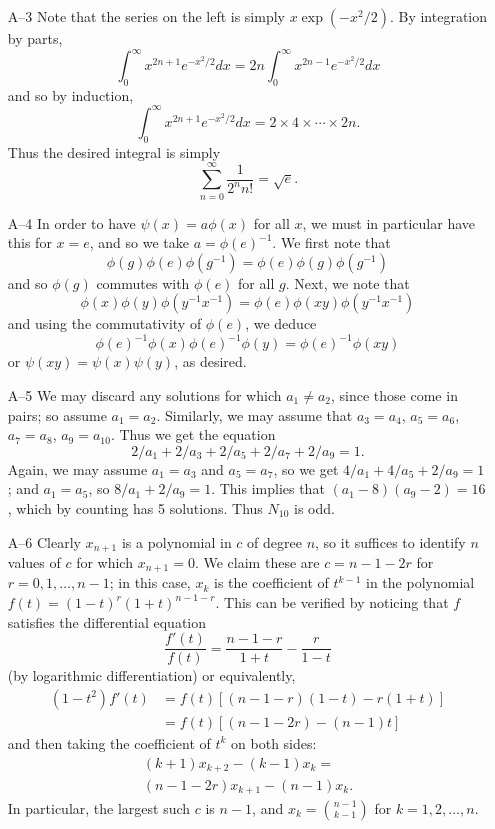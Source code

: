 \documentclass[amssymb,twocolumn,pra,10pt,aps]{revtex4-1}
\begin{document}
\begin{itemize}
\item[A--3]
Note that the series on the left is simply $x \exp (-x^2/2)$.  By
integration by parts,
\[
\int_0^\infty x^{2n+1} e^{-x^2/2} dx =
2n \int_0^\infty x^{2n-1} e^{-x^2/2} dx
\]
and so by induction,
\[
\int_0^\infty x^{2n+1} e^{-x^2/2} dx =
2 \times 4 \times \cdots \times 2n.
\]
Thus the desired
integral is simply
\[
\sum_{n=0}^\infty \frac{1}{2^n n!} = \sqrt{e}.
\]

\item[A--4]
In order to have $\psi(x) = a \phi(x)$ for all $x$, we must in
particular have this for $x = e$, and so we take $a = \phi(e)^{-1}$.
We first note that
\[
\phi(g) \phi(e) \phi(g^{-1}) = \phi(e) \phi(g) \phi(g^{-1})
\]
and so $\phi(g)$ commutes with $\phi(e)$ for all $g$. Next, we note that
\[
\phi(x) \phi(y) \phi(y^{-1}x^{-1}) = \phi(e) \phi(xy) \phi(y^{-1}x^{-1})
\]
and using the commutativity of $\phi(e)$, we deduce
\[
\phi(e)^{-1} \phi(x) \phi(e)^{-1} \phi(y) = \phi(e)^{-1} \phi(xy)
\]
or $\psi(xy) = \psi(x) \psi(y)$, as desired.

\item[A--5]
We may discard any solutions for which $a_1 \neq a_2$, since those come in
pairs; so assume $a_1 = a_2$.  Similarly, we may assume that $a_3 = a_4$,
$a_5 = a_6$, $a_7 = a_8$, $a_9=a_{10}$.  Thus we get the equation
\[
2/a_1 + 2/a_3 + 2/a_5 + 2/a_7 + 2/a_9 = 1.
\]
Again, we may assume $a_1 = a_3$ and $a_5 = a_7$, so we get $4/a_1 + 4/a_5
+ 2/a_9 = 1$; and $a_1 = a_5$, so $8/a_1 + 2/a_9 = 1$.  This implies that
$(a_1-8)(a_9-2) = 16$, which by counting has 5 solutions.  Thus $N_{10}$
is odd.

\item[A--6]
Clearly $x_{n+1}$ is a polynomial in $c$ of degree $n$,
so it suffices to identify $n$ values of $c$ for which $x_{n+1} =
0$. We claim these are $c = n-1-2r$ for $r=0,1,\dots, n-1$; in this
case, $x_k$ is the coefficient of $t^{k-1}$ in the polynomial
$f(t) = (1-t)^r (1+t)^{n-1-r}$. This can be verified by noticing that
$f$ satisfies the differential equation
\[
\frac{f'(t)}{f(t)} = \frac{n-1-r}{1+t} - \frac{r}{1-t}
\]
(by logarithmic differentiation) or equivalently,
\begin{align*}
(1-t^2) f'(t) &= f(t) [(n-1-r)(1-t) - r(1+t)] \\
&= f(t) [(n-1-2r)  - (n-1)t]
\end{align*}
and then taking the coefficient of $t^{k}$ on both sides:
\begin{gather*}
(k+1) x_{k+2} - (k-1) x_k = \\
(n-1-2r) x_{k+1} - (n-1) x_{k}.
\end{gather*}
In particular, the largest such $c$ is $n-1$, and $x_k =
\binom{n-1}{k-1}$ for $k= 1, 2, \dots, n$.


\end{itemize}
\end{document}
